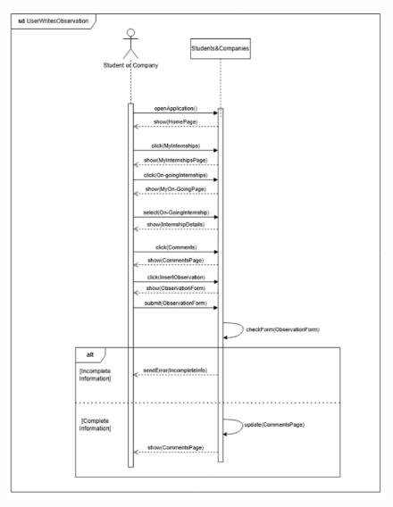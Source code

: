 \documentclass[a4paper,12pt]{article}
\begin{document}
\begin{figure}[H]
    \centering
    \includegraphics[scale = 0.9]{figures/UseCasesSD/UserWritesObservationSD.png}
\end{figure}
\newpage
\end{document}
